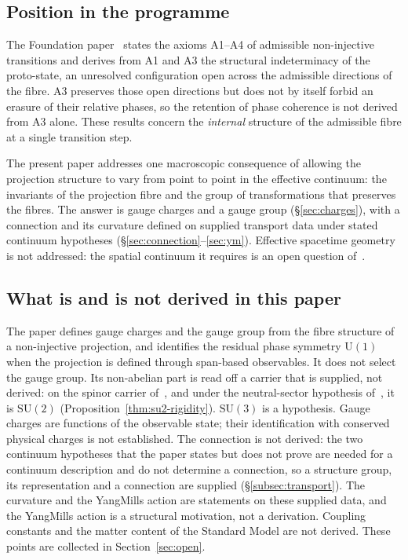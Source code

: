 \documentclass[11pt,a4paper]{article}
\begin{document}
  \subsection*{Position in the programme}

    The Foundation paper~\cite{Beau2026m} states the axioms A1--A4 of admissible non-injective
    transitions and derives from A1 and A3 the structural indeterminacy of the proto-state, an unresolved
    configuration open across the admissible directions of the fibre.
    A3 preserves those open directions but does not by itself forbid an erasure of their relative phases,
    so the retention of phase coherence is not derived from A3 alone.
    These results concern the \emph{internal} structure of the admissible fibre at a
    single transition step.

    The present paper addresses one macroscopic consequence of allowing the projection
    structure to vary from point to point in the effective continuum: the invariants of the
    projection fibre and the group of transformations that preserves the fibres.
    The answer is gauge charges and a gauge group (§\ref{sec:charges}), with a connection
    and its curvature defined on supplied transport data under stated continuum hypotheses
    (§\ref{sec:connection}--\ref{sec:ym}).
    Effective spacetime geometry is not addressed: the spatial continuum it requires is an open
    question of~\cite{Beau2026q5a}.

  \subsection*{What is and is not derived in this paper}

    The paper defines gauge charges and the gauge group from the fibre structure of a
    non-injective projection, and identifies the residual phase symmetry $\mathrm{U}(1)$ when the projection
    is defined through span-based observables.
    It does not select the gauge group.
    Its non-abelian part is read off a carrier that is supplied, not derived: on the spinor
    carrier of~\cite{Beau2026a27}, and under the neutral-sector hypothesis of~\cite{Beau2026a31},
    it is $\mathrm{SU}(2)$ (Proposition~\ref{thm:su2-rigidity}).
    $\mathrm{SU}(3)$ is a hypothesis.
    Gauge charges are functions of the observable state; their identification with conserved
    physical charges is not established.
    The connection is not derived: the two continuum hypotheses that the paper states but does not
    prove are needed for a continuum description and do not determine a connection, so a structure
    group, its representation and a connection are supplied (§\ref{subsec:transport}).
    The curvature and the Yang\textendash Mills action are statements on these supplied data, and
    the Yang\textendash Mills action is a structural motivation, not a derivation.
    Coupling constants and the matter content of the Standard Model are not derived.
    These points are collected in Section~\ref{sec:open}.
\end{document}
